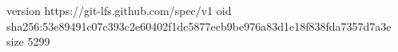 version https://git-lfs.github.com/spec/v1
oid sha256:53e89491c07c393c2e60402f1dc5877ecb9be976a83d1e18f838fda7357d7a3e
size 5299
